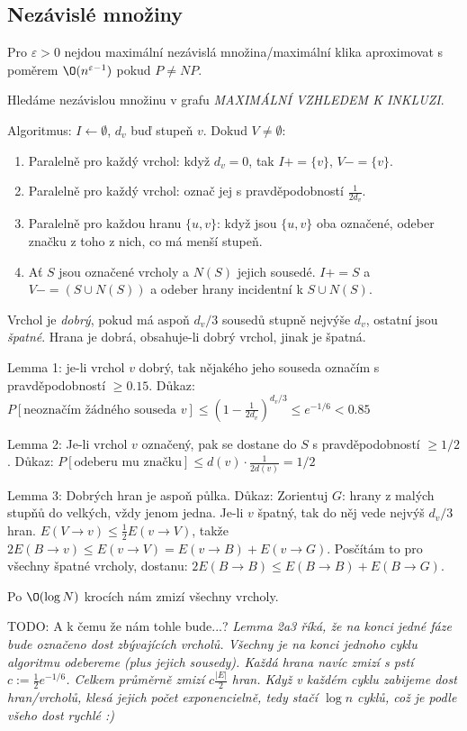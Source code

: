 \documentclass[a4paper,10pt,titlepage]{article} \usepackage[utf8]{inputenc}
\def\imp{\rightarrow}
\begin{document}
\subsection{Nezávislé množiny}
Pro $\varepsilon>0$ nejdou maximální nezávislá množina/maximální klika
aproximovat s poměrem $\O(n^{\varepsilon-1})$ pokud $P\neq NP$.

Hledáme nezávislou množinu v grafu \emph{MAXIMÁLNÍ VZHLEDEM K INKLUZI}.

Algoritmus: $I\gets\emptyset$, $d_v$ buď stupeň $v$. Dokud $V\neq\emptyset$:
\begin{enumerate}
\item Paralelně pro každý vrchol: když $d_v=0$, tak $I+=\{v\}$, $V-=\{v\}$.
\item Paralelně pro každý vrchol: označ jej s pravděpodobností $\frac{1}{2d_v}$.
\item Paralelně pro každou hranu $\{u,v\}$: když jsou $\{u,v\}$ oba označené,
	odeber značku z toho z nich, co má menší stupeň.
\item Ať $S$ jsou označené vrcholy a $N(S)$ jejich sousedé. $I+=S$ a $V-=(S\cup
	N(S))$ a odeber hrany incidentní k $S\cup N(S)$.
\end{enumerate}

Vrchol je \emph{dobrý}, pokud má aspoň $d_v/3$ sousedů stupně nejvýše $d_v$,
ostatní jsou \emph{špatné}. Hrana je dobrá, obsahuje-li dobrý vrchol, jinak je
špatná.

Lemma 1: je-li vrchol $v$ dobrý, tak nějakého jeho souseda označím s
pravděpodobností $\geq 0.15$.
Důkaz: $P[\text{neoznačím žádného souseda }v]\leq (1-\frac{1}{2d_v})^{d_v/3}\leq
	e^{-1/6}<0.85$

Lemma 2: Je-li vrchol $v$ označený, pak se dostane do $S$ s pravděpodobností
	$\geq 1/2$.
Důkaz: $P[\text{odeberu mu značku}]\leq d(v)\cdot\frac{1}{2d(v)}=1/2$

Lemma 3: Dobrých hran je aspoň půlka.
Důkaz: Zorientuj $G$: hrany z malých stupňů do velkých, vždy jenom jedna.
	Je-li $v$ špatný, tak do něj vede nejvýš $d_v/3$ hran.
	$E(V\imp v)\leq\frac{1}{2}E(v\imp V)$,
	takže $2E(B\imp v)\leq E(v\imp V)=E(v\imp B)+E(v\imp G)$.
	Posčítám to pro všechny špatné vrcholy, dostanu:
	$2E(B\imp B)\leq E(B\imp B)+E(B\imp G)$.

Po $\O(\log N)$ krocích nám zmizí všechny vrcholy.

TODO: A k čemu že nám tohle bude...? \textit{Lemma 2a3 říká, že na konci jedné fáze
bude označeno dost zbývajících vrcholů. Všechny je na konci jednoho cyklu
algoritmu odebereme (plus jejich sousedy). Každá hrana navíc zmizí s pstí 
$c := \frac{1}{2}e^{-1/6}$. Celkem průměrně zmizí $c\frac{|E|}{2}$ hran. Když v
každém cyklu zabijeme dost hran/vrcholů, klesá jejich počet exponencielně, tedy stačí
$\log{n}$ cyklů, což je podle všeho dost rychlé :)}
\end{document}
